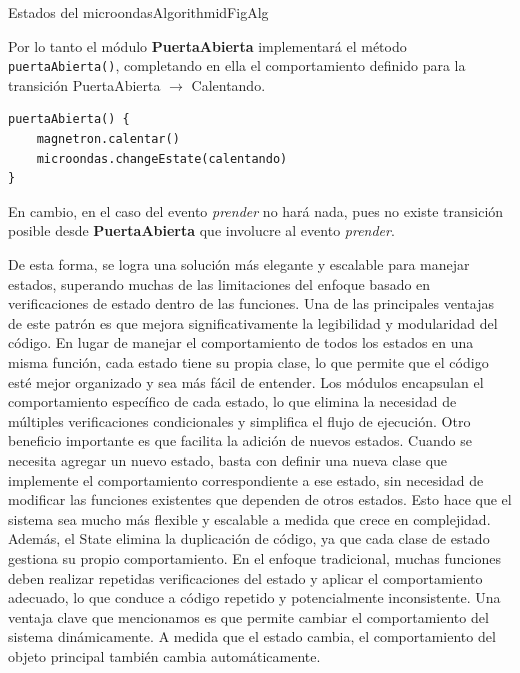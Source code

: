 \begin{pattern}[]{Estados del microondas}{Algorithm}{idFigAlg}
\assigns
{}

\end{pattern}

Por lo tanto el módulo \textbf{PuertaAbierta} implementará el método \verb|puertaAbierta()|, completando en ella el comportamiento definido para la transición PuertaAbierta $\xrightarrow{}$ Calentando.

\begin{lstlisting}[caption=Implementación  puertaAbierta, style=seudocode]
puertaAbierta() {
    magnetron.calentar()
    microondas.changeEstate(calentando)
}
\end{lstlisting}

En cambio, en el caso del evento \textit{prender} no hará nada, pues no existe transición posible desde \textbf{PuertaAbierta} que involucre al evento \textit{prender}.

De esta forma, se logra una solución más elegante y escalable para manejar estados, superando muchas de las limitaciones del enfoque basado en verificaciones de estado dentro de las funciones. Una de las principales ventajas de este patrón es que mejora significativamente la legibilidad y modularidad del código. En lugar de manejar el comportamiento de todos los estados en una misma función, cada estado tiene su propia clase, lo que permite que el código esté mejor organizado y sea más fácil de entender. Los módulos encapsulan el comportamiento específico de cada estado, lo que elimina la necesidad de múltiples verificaciones condicionales y simplifica el flujo de ejecución. Otro beneficio importante es que facilita la adición de nuevos estados. Cuando se necesita agregar un nuevo estado, basta con definir una nueva clase que implemente el comportamiento correspondiente a ese estado, sin necesidad de modificar las funciones existentes que dependen de otros estados. Esto hace que el sistema sea mucho más flexible y escalable a medida que crece en complejidad. Además, el State elimina la duplicación de código, ya que cada clase de estado gestiona su propio comportamiento. En el enfoque tradicional, muchas funciones deben realizar repetidas verificaciones del estado y aplicar el comportamiento adecuado, lo que conduce a código repetido y potencialmente inconsistente. Una ventaja clave que mencionamos es que permite cambiar el comportamiento del sistema dinámicamente. A medida que el estado cambia, el comportamiento del objeto principal también cambia automáticamente. 

